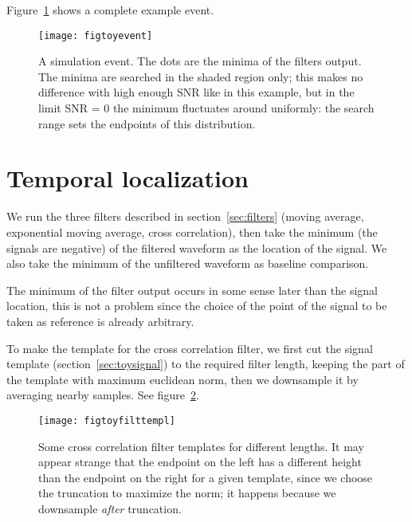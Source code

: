 Figure~\ref{fig:toyevent} shows a complete example event.

\begin{figure}
    \hspace{-0.15\textwidth}
    \texttt{[image: figtoyevent]}
    
    \caption{A simulation event. The dots are the minima of the filters output.
    The minima are searched in the shaded region only; this makes no difference
    with high enough SNR like in this example, but in the limit SNR = 0 the
    minimum fluctuates around uniformly: the search range sets the endpoints of
    this distribution.}
    
    \label{fig:toyevent}
\end{figure}

\section{Temporal localization}

We run the three filters described in section~\ref{sec:filters} (moving
average, exponential moving average, cross correlation), then take the minimum
(the signals are negative) of the filtered waveform as the location of the
signal. We also take the minimum of the unfiltered waveform as baseline
comparison.

The minimum of the filter output occurs in some sense later than the signal
location, this is not a problem since the choice of the point of the signal to
be taken as reference is already arbitrary.

To make the template for the cross correlation filter, we first cut the signal
template (section~\ref{sec:toysignal}) to the required filter length, keeping
the part of the template with maximum euclidean norm, then we downsample it by
averaging nearby samples. See figure~\ref{fig:toyfilttempl}.

\begin{figure}
    \hspace{0.00\textwidth}
    \texttt{[image: figtoyfilttempl]}
    
    \caption{Some cross correlation filter templates for different lengths. It
    may appear strange that the endpoint on the left has a different height
    than the endpoint on the right for a given template, since we choose the
    truncation to maximize the norm; it happens because we downsample
    \emph{after} truncation.}
    
    \label{fig:toyfilttempl}
\end{figure}


